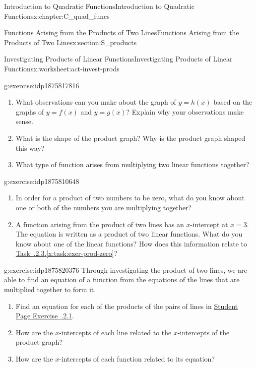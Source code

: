 \documentclass[oneside,10pt,]{book}
\newcommand{\xreffont}{\relax}
\numberwithin{equation}{chapter}
\begin{document}
\begin{chapterptx}{Introduction to Quadratic Functions}{}{Introduction to Quadratic Functions}{}{}{x:chapter:C_quad_funcs}
\begin{sectionptx}{Functions Arising from the Products of Two Lines}{}{Functions Arising from the Products of Two Lines}{}{}{x:section:S_products}
\begin{worksheet-subsection}{Investigating Products of Linear Functions}{}{Investigating Products of Linear Functions}{}{}{x:worksheet:act-invest-prods}
\begin{divisionexercise}{2}{}{}{g:exercise:idp1875817816}%
\begin{enumerate}[font=\bfseries,label=(\alph*),ref=\alph*]
\item{}What observations can you make about the graph of \(y = h(x)\) based on the graphs of \(y = f(x)\) and \(y = g(x)\)? Explain why your observations make sense.%
\item{}What is the shape of the product graph? Why is the product graph shaped this way?%
\item{}What type of function arises from multiplying two linear functions together?%
\end{enumerate}
\end{divisionexercise}%
\begin{divisionexercise}{3}{}{}{g:exercise:idp1875810648}%
\begin{enumerate}[font=\bfseries,label=(\alph*),ref=\alph*]
\item\label{x:task:exer-prod-zero}In order for a product of two numbers to be zero, what do you know about one or both of the numbers you are multiplying together?%
\item{}A function arising from the product of two lines has an \(x\)-intercept at \(x = 3\). The equation is written as a product of two linear functions. What do you know about one of the linear functions? How does this information relate to \hyperref[x:task:exer-prod-zero]{Task~{\xreffont 4.2.2.3}.{\xreffont\ref{x:task:exer-prod-zero}}}?%
\end{enumerate}
\end{divisionexercise}%
\begin{divisionexercise}{4}{}{}{g:exercise:idp1875820376}%
Through investigating the product of two lines, we are able to find an equation of a function from the equations of the lines that are multiplied together to form it.%
\begin{enumerate}[font=\bfseries,label=(\alph*),ref=\alph*]
\item{}Find an equation for each of the products of the pairs of lines in \hyperlink{x:exercise:exer-tbl-plot-prods}{Student Page Exercise~{\xreffont 4.2.2.1}}.%
\item{}How are the \(x\)-intercepts of each line related to the \(x\)-intercepts of the product graph?%
\item{}How are the \(x\)-intercepts of each function related to its equation?%
\end{enumerate}
\end{divisionexercise}%

\end{worksheet-subsection}
\end{sectionptx}
\end{chapterptx}
\end{document}
